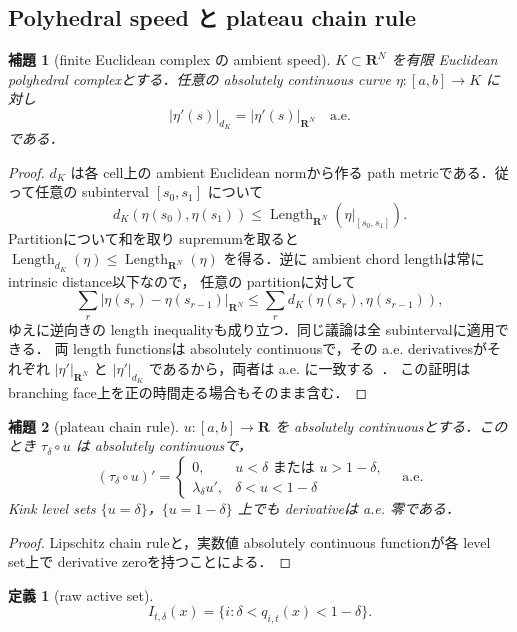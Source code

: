 \documentclass[a4paper,11pt]{ltjsarticle}
\numberwithin{equation}{section}
\theoremstyle{plain}
\newtheorem{lemma}[lemma]{補題}
\theoremstyle{definition}
\newtheorem{definition}[definition]{定義}
\theoremstyle{remark}
\newcommand{\RR}{\mathbf R}
\newcommand{\Length}{\operatorname{Length}}
\begin{document}
\subsection{Polyhedral speed と plateau chain rule}

\begin{lemma}[finite Euclidean complex の ambient speed]\label{lem:polyhedral-speed}
$K\subset\RR^N$ を有限 Euclidean polyhedral complexとする．任意の absolutely continuous curve
$\eta:[a,b]\to K$ に対し
\[
 |\eta'(s)|_{d_K}=|\eta'(s)|_{\RR^N}
 \quad\text{a.e.}
\]
である．
\end{lemma}

\begin{proof}
$d_K$ は各 cell上の ambient Euclidean normから作る path metricである．従って任意の subinterval $[s_0,s_1]$ について
\[
 d_K(\eta(s_0),\eta(s_1))
 \le \Length_{\RR^N}(\eta|_{[s_0,s_1]}).
\]
Partitionについて和を取り supremumを取ると
$\Length_{d_K}(\eta)\le\Length_{\RR^N}(\eta)$ を得る．逆に ambient chord lengthは常に intrinsic distance以下なので，
任意の partitionに対して
\[
 \sum_r|\eta(s_r)-\eta(s_{r-1})|_{\RR^N}
 \le\sum_r d_K(\eta(s_r),\eta(s_{r-1})),
\]
ゆえに逆向きの length inequalityも成り立つ．同じ議論は全 subintervalに適用できる．
両 length functionsは absolutely continuousで，その a.e. derivativesがそれぞれ
$|\eta'|_{\RR^N}$ と $|\eta'|_{d_K}$ であるから，両者は a.e. に一致する~\cite{AGS}．
この証明は branching face上を正の時間走る場合もそのまま含む．
\end{proof}

\begin{lemma}[plateau chain rule]\label{lem:plateau-chain-rule}
$u:[a,b]\to\RR$ を absolutely continuousとする．このとき $\tau_\delta\circ u$ は absolutely continuousで，
\[
 (\tau_\delta\circ u)'=
 \begin{cases}
 0,&u<\delta\text{ または }u>1-\delta,\\
 \lambda_\delta u',&\delta<u<1-\delta
 \end{cases}
 \quad\text{a.e.}
\]
Kink level sets $\{u=\delta\}$，$\{u=1-\delta\}$ 上でも derivativeは a.e. 零である．
\end{lemma}

\begin{proof}
Lipschitz chain ruleと，実数値 absolutely continuous functionが各 level set上で derivative zeroを持つことによる．
\end{proof}

\begin{definition}[raw active set]\label{def:raw-active-set}
\[
 I_{t,\delta}(x)=\{i:\delta<q_{i,t}(x)<1-\delta\}.
\]
\end{definition}
\end{document}

